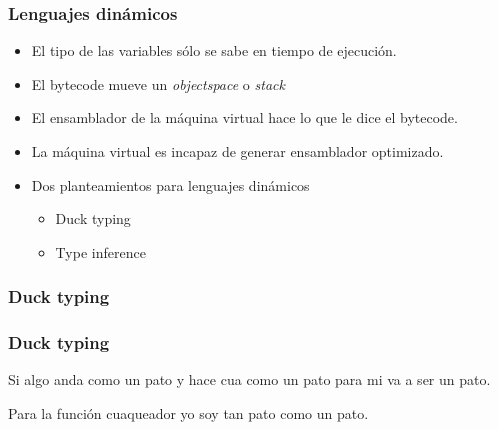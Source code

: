 \documentclass{beamer}
\begin{document}
\begin{frame}
  \frametitle{Lenguajes dinámicos}
  \begin{itemize}
  \item El tipo de las variables sólo se sabe en tiempo de ejecución.
  \item El bytecode mueve un \textit{objectspace} o \textit{stack}
  \item El ensamblador de la máquina virtual hace lo que le dice el
    bytecode.
  \item La máquina virtual es incapaz de generar ensamblador
    optimizado.
  \item Dos planteamientos para lenguajes dinámicos
    \begin{itemize}
    \item Duck typing
    \item Type inference
    \end{itemize}
  \end{itemize}
\end{frame}


\begin{frame}
\frametitle{Duck typing}
\testcode
\end{frame}

\begin{frame}
 \frametitle{Duck typing}
Si algo anda como un pato y hace cua como un pato para mi va a ser un pato.

Para la función cuaqueador yo soy tan pato como un pato.
\end{frame}
\end{document}
